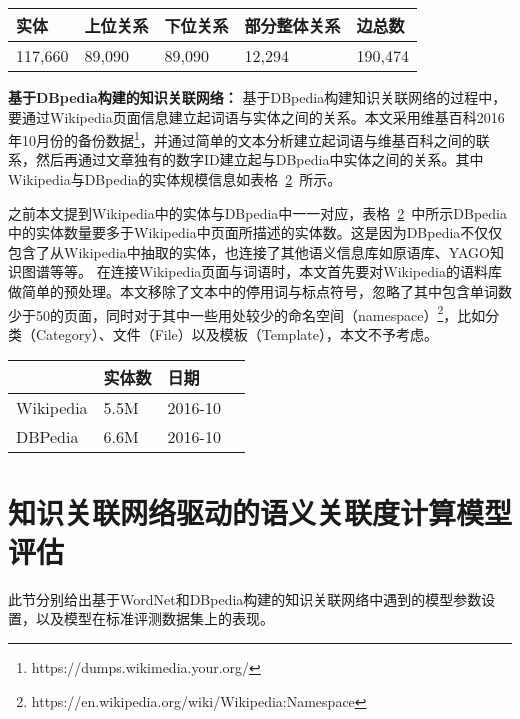 \begin{table}[htbp]
    \center
    \vspace{5pt}
    \begin{tabular}{|p{1.6cm}|p{1.6cm}|p{1.6cm}|p{2.5cm}|p{1.6cm}|}
    \hline
    实体   & 上位关系 & 下位关系 & 部分整体关系 & 边总数   \\ \hline
    117,660   & 89,090 & 89,090 & 12,294 & 190,474    \\ \hline
    \end{tabular}
    \label{wordnet_data}
\end{table}

\textbf{基于DBpedia构建的知识关联网络：}
基于DBpedia构建知识关联网络的过程中，要通过Wikipedia页面信息建立起词语与实体之间的关系。本文采用维基百科2016年10月份的备份数据\footnote{https://dumps.wikimedia.your.org/}，并通过简单的文本分析建立起词语与维基百科之间的联系，然后再通过文章独有的数字ID建立起与DBpedia中实体之间的关系。其中Wikipedia与DBpedia的实体规模信息如表格~\ref{wiki_data}~所示。

之前本文提到Wikipedia中的实体与DBpedia中一一对应，表格~\ref{wiki_data}~中所示DBpedia中的实体数量要多于Wikipedia中页面所描述的实体数。这是因为DBpedia不仅仅包含了从Wikipedia中抽取的实体，也连接了其他语义信息库如原语库、YAGO知识图谱等等。
在连接Wikipedia页面与词语时，本文首先要对Wikipedia的语料库做简单的预处理。本文移除了文本中的停用词与标点符号，忽略了其中包含单词数少于50的页面，同时对于其中一些用处较少的命名空间（namespace）\footnote{https://en.wikipedia.org/wiki/Wikipedia:Namespace}，比如分类（Category）、文件（File）以及模板（Template），本文不予考虑。

\begin{table}[htbp]
    \center
    \vspace{5pt}
    \begin{tabular}{|p{2cm}|p{2cm}|p{2cm}|p{2cm}|}
    \hline
              & 实体数    & 日期        \\ \hline
    Wikipedia & 5.5M     & 2016-10     \\ \hline
    DBPedia   & 6.6M     & 2016-10     \\ \hline
    \end{tabular}
    \label{wiki_data}
\end{table}


\section{知识关联网络驱动的语义关联度计算模型评估}
此节分别给出基于WordNet和DBpedia构建的知识关联网络中遇到的模型参数设置，以及模型在标准评测数据集上的表现。

